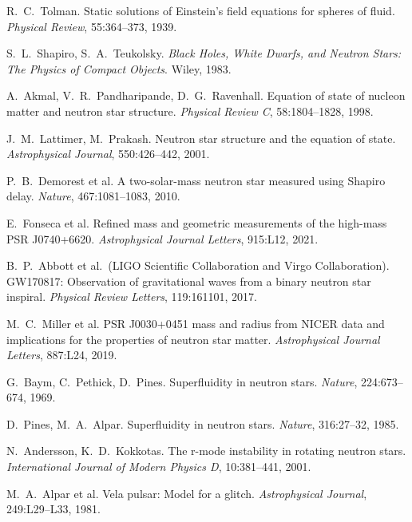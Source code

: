\documentclass[12pt,a4paper]{article}
\theoremstyle{definition}
\theoremstyle{remark}
\begin{document}
\begin{thebibliography}{99}

R.~C.~Tolman.
\newblock Static solutions of Einstein's field equations for spheres of fluid.
\newblock \emph{Physical Review}, 55:364--373, 1939.

S.~L.~Shapiro, S.~A.~Teukolsky.
\newblock \emph{Black Holes, White Dwarfs, and Neutron Stars: The Physics of Compact Objects}.
\newblock Wiley, 1983.

A.~Akmal, V.~R.~Pandharipande, D.~G.~Ravenhall.
\newblock Equation of state of nucleon matter and neutron star structure.
\newblock \emph{Physical Review C}, 58:1804--1828, 1998.

J.~M.~Lattimer, M.~Prakash.
\newblock Neutron star structure and the equation of state.
\newblock \emph{Astrophysical Journal}, 550:426--442, 2001.

P.~B.~Demorest et al.
\newblock A two-solar-mass neutron star measured using Shapiro delay.
\newblock \emph{Nature}, 467:1081--1083, 2010.

E.~Fonseca et al.
\newblock Refined mass and geometric measurements of the high-mass PSR J0740+6620.
\newblock \emph{Astrophysical Journal Letters}, 915:L12, 2021.

B.~P.~Abbott et al.\ (LIGO Scientific Collaboration and Virgo Collaboration).
\newblock GW170817: Observation of gravitational waves from a binary neutron star inspiral.
\newblock \emph{Physical Review Letters}, 119:161101, 2017.

M.~C.~Miller et al.
\newblock PSR J0030+0451 mass and radius from NICER data and implications for the properties of neutron star matter.
\newblock \emph{Astrophysical Journal Letters}, 887:L24, 2019.

G.~Baym, C.~Pethick, D.~Pines.
\newblock Superfluidity in neutron stars.
\newblock \emph{Nature}, 224:673--674, 1969.

D.~Pines, M.~A.~Alpar.
\newblock Superfluidity in neutron stars.
\newblock \emph{Nature}, 316:27--32, 1985.

N.~Andersson, K.~D.~Kokkotas.
\newblock The r-mode instability in rotating neutron stars.
\newblock \emph{International Journal of Modern Physics D}, 10:381--441, 2001.

M.~A.~Alpar et al.
\newblock Vela pulsar: Model for a glitch.
\newblock \emph{Astrophysical Journal}, 249:L29--L33, 1981.


\end{thebibliography}
\end{document}
